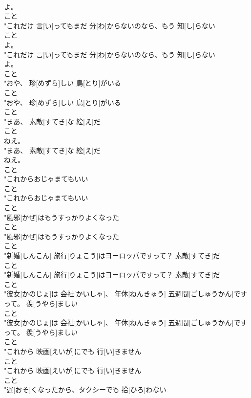 \documentclass[8pt]{extreport}
\begin{document}
\begin{CJK}{UTF8}{min}
\\	よ。
\\	こと
\\	"これだけ 言[い]ってもまだ 分[わ]からないのなら、もう 知[し]らない
\\	こと
\\	よ。
\\	"これだけ 言[い]ってもまだ 分[わ]からないのなら、もう 知[し]らない
\\	よ。
\\	こと
\\	"おや、 珍[めずら]しい 鳥[とり]がいる
\\	こと
\\	"おや、 珍[めずら]しい 鳥[とり]がいる
\\	こと
\\	"まあ、 素敵[すてき]な 絵[え]だ
\\	こと
\\	ねえ。
\\	"まあ、 素敵[すてき]な 絵[え]だ
\\	ねえ。
\\	こと
\\	"これからおじゃまてもいい
\\	こと
\\	"これからおじゃまてもいい
\\	こと
\\	"風邪[かぜ]はもうすっかりよくなった
\\	こと
\\	"風邪[かぜ]はもうすっかりよくなった
\\	こと
\\	"新婚[しんこん] 旅行[りょこう]はヨーロッパですって？ 素敵[すてき]だ
\\	こと
\\	"新婚[しんこん] 旅行[りょこう]はヨーロッパですって？ 素敵[すてき]だ
\\	こと
\\	"彼女[かのじょ]は 会社[かいしゃ]、 年休[ねんきゅう] 五週間[ごしゅうかん]ですって。 羨[うやら]ましい
\\	こと
\\	"彼女[かのじょ]は 会社[かいしゃ]、 年休[ねんきゅう] 五週間[ごしゅうかん]ですって。 羨[うやら]ましい
\\	こと
\\	"これから 映画[えいが]にでも 行[い]きません
\\	こと
\\	"これから 映画[えいが]にでも 行[い]きません
\\	こと
\\	"遅[おそ]くなったから、タクシーでも 拾[ひろ]わない

\end{CJK}
\end{document}
